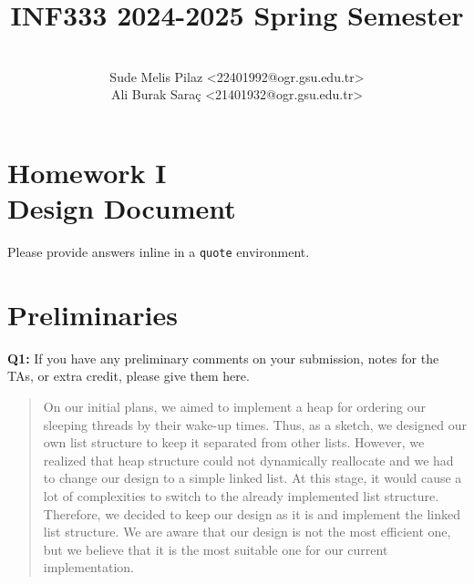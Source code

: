 \documentclass[a4paper,11pt]{paper}
\title{INF333 2024-2025 Spring Semester}
\author{
\textbf{\color{teal}{Pintocchio}} 
\\ Sude Melis Pilaz <22401992@ogr.gsu.edu.tr>
\\ Ali Burak Saraç <21401932@ogr.gsu.edu.tr>}
\begin{document}
\maketitle

\section*{\LARGE Homework I \\
Design Document}

Please provide answers inline in a \texttt{quote} environment.


\section{Preliminaries}

\textbf{Q1:} If you have any preliminary comments on your submission, notes for the TAs, or extra credit, please give them here.
\begin{quote}
On our initial plans, we aimed to implement a heap for ordering our sleeping
	threads by their wake-up times. Thus, as a sketch, we designed our own list
	structure to keep it separated from other lists. However, we realized that
	heap structure could not dynamically reallocate and we had to change our design
	to a simple linked list. At this stage, it would cause a lot of complexities
	to switch to the already implemented list structure. Therefore, we decided
	to keep our design as it is and implement the linked list structure. We are
	aware that our design is not the most efficient one, but we believe that it is
	the most suitable one for our current implementation.
\end{quote}
\end{document}

